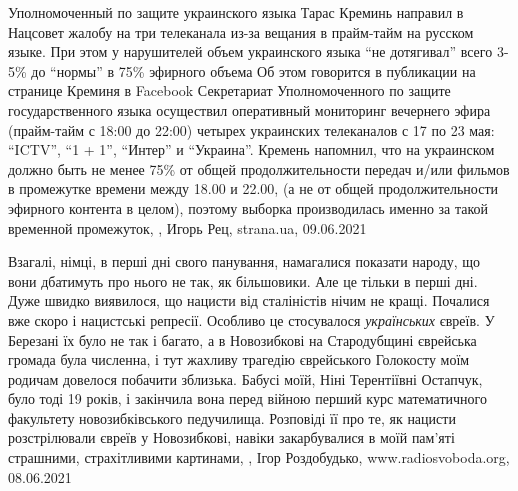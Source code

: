 Уполномоченный по защите украинского языка Тарас Креминь направил в Нацсовет
жалобу на три телеканала из-за вещания в прайм-тайм на русском языке. При этом
у нарушителей объем украинского языка \enquote{не дотягивал} всего 3-5\% до \enquote{нормы} в
75\% эфирного объема Об этом говорится в публикации на странице Креминя в
Facebook Секретариат Уполномоченного по защите государственного языка
осуществил оперативный мониторинг вечернего эфира (прайм-тайм с 18:00 до 22:00)
четырех украинских телеканалов с 17 по 23 мая: \enquote{ICTV}, \enquote{1 + 1}, \enquote{Интер} и
\enquote{Украина}.  Кремень напомнил, что на украинском должно быть не менее 75\% от
общей продолжительности передач и/или фильмов в промежутке времени между 18.00
и 22.00, (а не от общей продолжительности эфирного контента в целом), поэтому
выборка производилась именно за такой временной промежуток,
, Игорь Рец, strana.ua, 09.06.2021


Взагалі, німці, в перші дні свого панування, намагалися показати народу, що
вони дбатимуть про нього не так, як більшовики. Але це тільки в перші дні. Дуже
швидко виявилося, що нацисти від сталіністів нічим не кращі. Почалися вже скоро
і нацистські репресії. Особливо це стосувалося \emph{українських} євреїв. У
Березані їх було не так і багато, а в Новозибкові на Стародубщині єврейська
громада була численна, і тут жахливу трагедію єврейського Голокосту моїм
родичам довелося побачити зблизька. Бабусі моїй, Ніні Терентіївні Остапчук,
було тоді 19 років, і закінчила вона перед війною перший курс математичного
факультету новозибківського педучилища. Розповіді її про те, як нацисти
розстрілювали євреїв у Новозибкові, навіки закарбувалися в моїй пам'яті
страшними, страхітливими картинами,
, 
Ігор Роздобудько, www.radiosvoboda.org, 08.06.2021

